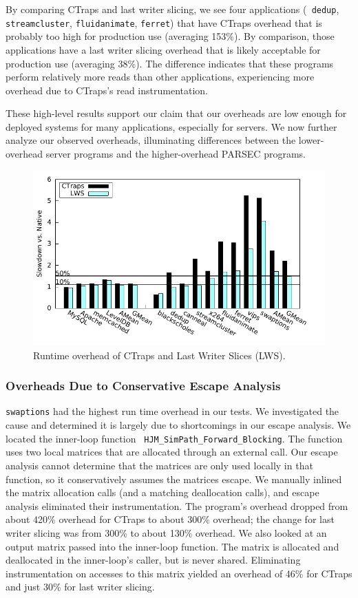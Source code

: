 \documentclass[preprint,10pt]{sigplanconf}
\newcommand{\ctraps}{CTraps\xspace}
\begin{document}
By comparing \ctraps and last writer slicing, we see four applications ({\tt
dedup}, {\tt streamcluster}, {\tt fluidanimate}, {\tt ferret}) that have
\ctraps overhead that is probably too high for production use (averaging
153\%).  By comparison, those applications have a last writer slicing overhead
that is likely acceptable for production use (averaging 38\%).  The difference
indicates that these programs perform relatively more reads than other
applications, experiencing more overhead due to \ctraps's read instrumentation.

These high-level results support our claim that our overheads 
are low enough for deployed systems for many applications, especially
for servers.  We now further analyze our observed overheads, illuminating
differences between the lower-overhead server programs and the higher-overhead
PARSEC programs.

\begin{figure}
\centering
\includegraphics[width=.9\columnwidth]{plots/perf.pdf}
\caption{\label{fig:perfall}Runtime overhead of \ctraps and Last Writer Slices (LWS).}
\end{figure}

\subsubsection{Overheads Due to Conservative Escape Analysis}
\label{sec:eval:conservative}
{\tt swaptions} had the highest run time overhead in our tests.  We
investigated the cause and determined it is largely due to shortcomings in our
escape analysis.  We located the inner-loop function {\tt
HJM\_SimPath\_Forward\_Blocking}.  The function uses two local matrices that
are allocated through an external call.  Our escape analysis cannot determine
that the matrices are only used locally in that function, so it conservatively
assumes the matrices escape.  We manually inlined the matrix allocation calls
(and a matching deallocation calls), and escape analysis eliminated their
instrumentation.  The program's overhead dropped from about 420\% overhead for
\ctraps to about 300\% overhead; the change for last writer slicing was from
300\% to about 130\% overhead.  We also looked at an output matrix passed into
the inner-loop function.  The matrix is allocated and deallocated in the
inner-loop's caller, but is never shared.  Eliminating instrumentation on
accesses to this matrix yielded an overhead of 46\% for \ctraps and 
just 30\% for last writer slicing.  
\end{document}
